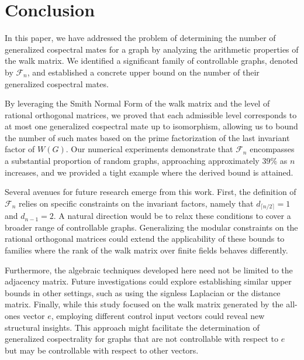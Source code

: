 \documentclass[12pt]{article}
\theoremstyle{plain}
\theoremstyle{definition}
\begin{document}
\section{Conclusion}
\label{section:conclusion}
In this paper, we have addressed the problem of determining the number of generalized cospectral mates for a graph by analyzing the arithmetic properties of the walk matrix. We identified a significant family of controllable graphs, denoted by $\mathcal{F}_n$, and established a concrete upper bound on the number of their generalized cospectral mates. 

By leveraging the Smith Normal Form of the walk matrix and the level of rational orthogonal matrices, we proved that each admissible level corresponds to at most one generalized cospectral mate up to isomorphism, allowing us to bound the number of such mates based on the prime factorization of the last invariant factor of $W(G)$. Our numerical experiments demonstrate that $\mathcal{F}_n$ encompasses a substantial proportion of random graphs, approaching approximately $39\%$ as $n$ increases, and we provided a tight example where the derived bound is attained.

Several avenues for future research emerge from this work. First, the definition of $\mathcal{F}_n$ relies on specific constraints on the invariant factors, namely that $d_{\lceil n/2 \rceil} = 1$ and $d_{n-1} = 2$. A natural direction would be to relax these conditions to cover a broader range of controllable graphs. Generalizing the modular constraints on the rational orthogonal matrices could extend the applicability of these bounds to families where the rank of the walk matrix over finite fields behaves differently.

Furthermore, the algebraic techniques developed here need not be limited to the adjacency matrix. Future investigations could explore establishing similar upper bounds in other settings, such as using the signless Laplacian or the distance matrix. Finally, while this study focused on the walk matrix generated by the all-ones vector $e$, employing different control input vectors could reveal new structural insights. This approach might facilitate the determination of generalized cospectrality for graphs that are not controllable with respect to $e$ but may be controllable with respect to other vectors.

% 
% 
\end{document}
